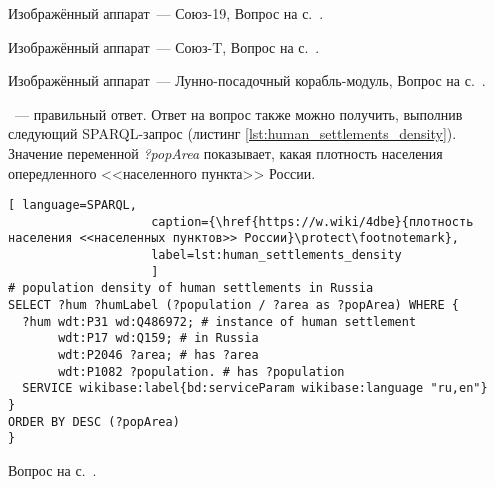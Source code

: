 \begin{task}
    \label{answer:spacecraft_soyuz19}
    Изображённый аппарат~--- Союз-19, 
    \small{Вопрос на с.~\pageref{question:spacecraft_soyuz19}.}
\end{task}

\begin{task}
    \label{answer:spacecraft_soyuzT}
    Изображённый аппарат~--- Союз-T, 
    \small{Вопрос на с.~\pageref{question:spacecraft_soyuzT}.}
\end{task}

\begin{task}
    \label{answer:spacecraft_lunar}
    Изображённый аппарат~--- Лунно-посадочный корабль-модуль, 
    \small{Вопрос на с.~\pageref{question:spacecraft_lunar}.}
\end{task}

\begin{task}
\label{answer:human_settlements_density}
~--- правильный ответ. Ответ на вопрос также можно получить, выполнив следующий SPARQL-запрос (листинг \ref{lst:human_settlements_density}). Значение переменной \textit{?popArea} показывает, какая плотность населения опередленного <<населенного пункта>> России.
 
\begin{lstlisting}[ language=SPARQL, 
                    caption={\href{https://w.wiki/4dbe}{плотность населения <<населенных пунктов>> России}\protect\footnotemark},
                    label=lst:human_settlements_density
                    ]
# population density of human settlements in Russia
SELECT ?hum ?humLabel (?population / ?area as ?popArea) WHERE {
  ?hum wdt:P31 wd:Q486972; # instance of human settlement
       wdt:P17 wd:Q159; # in Russia
       wdt:P2046 ?area; # has ?area 
       wdt:P1082 ?population. # has ?population
  SERVICE wikibase:label{bd:serviceParam wikibase:language "ru,en"}
}
ORDER BY DESC (?popArea)
}
\end{lstlisting}

\small{Вопрос на с.~\pageref{ch:human-settlement}.}

\end{task}


